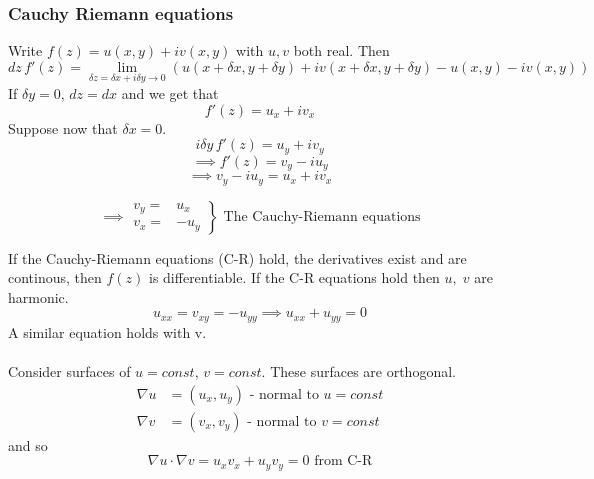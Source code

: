 \documentclass{article}
\begin{document}
\subsubsection*{Cauchy Riemann equations}
Write $f(z) = u(x,y) + iv(x,y)$ with $u,v$ both real. Then
\[ dz \, f'(z) = \lim_{\delta z = \delta x + i \delta y \to 0} \left(
u(x+\delta x, y+ \delta y) + iv(x+\delta x,y+\delta y) - u(x,y) - iv(x,y) 
\right) \]
If $\delta y = 0$, $dz = dx$ and we get that
\[ f'(z) = u_x + i v_x \]
Suppose now that $\delta x = 0$.
\[ i \delta y\, f'(z) = u_y+iv_y \]
\[ \implies f'(z) = v_y - i u_y \]
\[ \implies v_y - iu_y = u_x + iv_x \]
\begin{framed}
\[ \implies \left. \begin{array}{cr}
v_y =& u_x \\
v_x =& -u_y \end{array} \right\} \mbox{ The Cauchy-Riemann equations} \]
\end{framed}
If the Cauchy-Riemann equations (C-R) hold, the derivatives exist and are 
continous, then $f(z)$ is differentiable. If the C-R equations hold
then $u, \; v$ are harmonic.
\[ u_{xx} = v_{xy} = -u_{yy} \implies u_{xx}+u_{yy} =0 \]
A similar equation holds with v.
\\
\\
Consider surfaces of $u=const$, $v=const$. These surfaces are orthogonal.
\begin{align*}
\nabla u &= (u_x,u_y) \mbox{ - normal to } u = const \\
\nabla v &= (v_x,v_y) \mbox{ - normal to } v = const 
\end{align*}
and so
\[ \nabla u \cdot \nabla v = u_xv_x + u_yv_y =0 \mbox{ from C-R} \]
%
%
\end{document}
